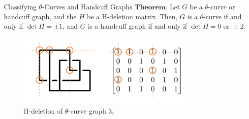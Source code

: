 \documentclass[final]{beamer}
\begin{document}
\begin{frame}[t]
\begin{columns}[t]
\begin{block}{Classifying $\theta$-Curves and Handcuff Graphs}
  $\mathbf{Theorem.}$ Let $G$ be a $\theta$-curve or handcuff graph, and the $H$ be a H-deletion matrix. Then,
  $G$ is a $\theta$-curve if and only if $\det{H} = \pm 1$, and $G$ is a handcuff graph if and only if $\det{H} = 0 \text{ or } \pm2$.
  \begin{figure}[h]
    \centering
    \includegraphics[width=0.8\textwidth]{figure/Hdeletion.png}
    \caption{H-deletion of $\theta$-curve graph $3_1$}
  \end{figure}
  \end{block}


\end{columns}
\end{frame}
\end{document}
